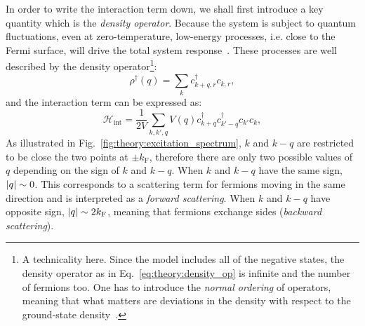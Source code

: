 In order to write the interaction term down, we shall first introduce a key quantity which is the \textit{density operator}. Because the system is subject to quantum fluctuations, even at zero-temperature, low-energy processes, i.e. close to the Fermi surface, will drive the total system response~\cite{giamarchi2006strong}. These processes are well described by the density operator\footnote[4]{A technicality here. Since the model includes all of the negative states, the density operator as in Eq.~\ref{eq:theory:density_op} is infinite and the number of fermions too. One has to introduce the \textit{normal ordering} of operators, meaning that what matters are deviations in the density with respect to the ground-state density~\cite{von1998bosonization}.}:
%
\begin{equation}
    \rho^\dagger(q) = \sum_k c^\dagger_{k+q, r}c_{k,r},
    \label{eq:theory:density_op}
\end{equation}
%
and the interaction term can be expressed as:
%
\begin{equation}
    \mathcal{H}_\textrm{int}=\frac{1}{2V}\sum_{k,k',q}V(q)c^\dagger_{k+q}c^\dagger_{k'-q}c_{k'}c_{k},
    \label{eq:theory:lutt_int}
\end{equation}
%
As illustrated in Fig.~\ref{fig:theory:excitation_spectrum}, $k$ and $k-q$ are restricted to be close the two points at $\pm k_\textrm{F}$, therefore there are only two possible values of $q$ depending on the sign of $k$ and $k-q$. When $k$ and $k-q$ have the same sign, $\abs{q}\sim 0$. This corresponds to a scattering term for fermions moving in the same direction and is interpreted as a \textit{forward scattering}. When $k$ and $k-q$ have opposite sign, $\abs{q}\sim 2k_\textrm{F}$, meaning that fermions exchange sides (\textit{backward scattering}).
%
